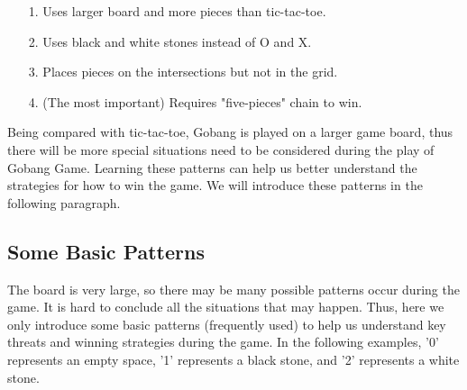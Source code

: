 \documentclass[11pt, a4paper]{article}
\begin{document}
\begin{itemize}
\item[1.] Uses larger board and more pieces than tic-tac-toe.
\item[2.] Uses black and white stones instead of O and X.
\item[3.] Places pieces on the intersections but not in the grid.
\item[4.] (The most important) Requires "five-pieces" chain to win.

\end{itemize}

Being compared with tic-tac-toe, Gobang is played on a larger game board, thus there will be more special situations need to be considered during the play of Gobang Game. Learning these patterns can help us better understand the strategies for how to win the game. We will introduce these patterns in the following paragraph.

\subsection{Some Basic Patterns}

The board is very large, so there may be many possible patterns occur during the game. It is hard to conclude all the situations that may happen. Thus, here we only introduce some basic patterns (frequently used) to help us understand key threats and winning strategies during the game. In the following examples, '0' represents an empty space, '1' represents a black stone, and '2' represents a white stone.
\end{document}
